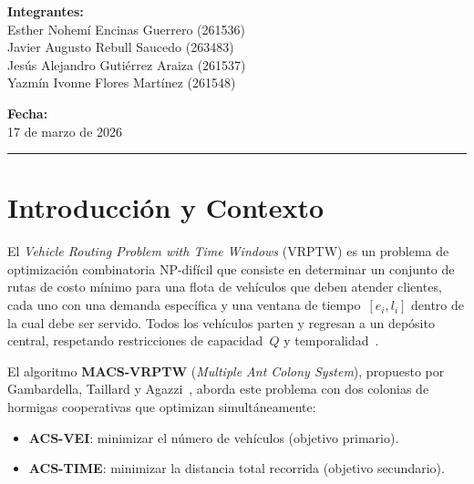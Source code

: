 \documentclass[12pt, letterpaper]{article}
\begin{document}
\begin{titlepage}
\begin{center}
    \vspace{0.4cm}

    {\large\bfseries\color{azulUACJ} Integrantes:}\\[0.1cm]
    {\large
      Esther Nohemí Encinas Guerrero (261536)\\[0.08cm]
      Javier Augusto Rebull Saucedo (263483)\\[0.08cm]
      Jesús Alejandro Gutiérrez Araiza (261537)\\[0.08cm]
      Yazmín Ivonne Flores Martínez (261548)
    }

    \vfill

    {\large\bfseries\color{azulUACJ} Fecha:}\\[0.1cm]
    {\large 17 de marzo de 2026}

    \vspace{0.3cm}

    {\color{azulUACJ}\rule{\textwidth}{2pt}}

  \end{center}
\end{titlepage}

\tableofcontents

\newpage
\section{Introducción y Contexto}
\label{sec:introduccion}

El \textit{Vehicle Routing Problem with Time Windows} (VRPTW) es un problema de optimización combinatoria NP-difícil que consiste en determinar un conjunto de rutas de costo mínimo para una flota de vehículos que deben atender clientes, cada uno con una demanda específica y una ventana de tiempo~$[e_i, l_i]$ dentro de la cual debe ser servido. Todos los vehículos parten y regresan a un depósito central, respetando restricciones de capacidad~$Q$ y temporalidad~\cite{solomon1987}.

El algoritmo \textbf{MACS-VRPTW} (\textit{Multiple Ant Colony System}), propuesto por Gambardella, Taillard y Agazzi~\cite{gambardella1999}, aborda este problema con dos colonias de hormigas cooperativas que optimizan simultáneamente:
\begin{itemize}[leftmargin=2cm]
  \item \textbf{ACS-VEI}: minimizar el número de vehículos (objetivo primario).
  \item \textbf{ACS-TIME}: minimizar la distancia total recorrida (objetivo secundario).
\end{itemize}
\end{document}
